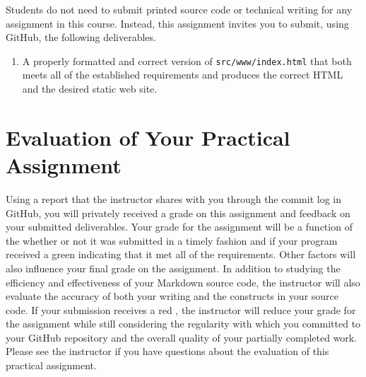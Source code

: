 \documentclass[11pt]{article}
\newcommand{\mainprogramsource}{\lstinline{src/www/index.html}}
\newcommand{\checkmark}{\ding{51}}
\newcommand{\naughtmark}{\ding{55}}
\begin{document}
\noindent Students do not need to submit printed source code or technical writing for any assignment in this course.
Instead, this assignment invites you to submit, using GitHub, the following deliverables.

\begin{enumerate}

\setlength{\itemsep}{0in}

\item A properly formatted and correct version of \mainprogramsource{} that both meets all of the established
  requirements and produces the correct HTML and the desired static web site.

\end{enumerate}

\section*{Evaluation of Your Practical Assignment}

Using a report that the instructor shares with you through the commit log in GitHub, you will privately received a grade
on this assignment and feedback on your submitted deliverables. Your grade for the assignment will be a function of the
whether or not it was submitted in a timely fashion and if your program received a green \checkmark{} indicating that it
met all of the requirements. Other factors will also influence your final grade on the assignment. In addition to
studying the efficiency and effectiveness of your Markdown source code, the instructor will also evaluate the accuracy of
both your writing and the constructs in your source code. If your submission receives a red \naughtmark{}, the
instructor will reduce your grade for the assignment while still considering the regularity with which you committed to
your GitHub repository and the overall quality of your partially completed work. Please see the instructor if you have
questions about the evaluation of this practical assignment.


\end{document}
